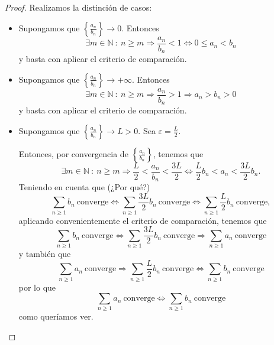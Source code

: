 \begin{proof} Realizamos la distinción de casos:
    \begin{itemize}
        \item Supongamos que $\left\{ \frac{a_n}{b_n} \right\} \longrightarrow 0$. Entonces
        \begin{equation*}
            \exists m \in \mathbb{N} ~:~ n \geq m \Longrightarrow \frac{a_n}{b_n} < 1 \Longleftrightarrow 0 \leq a_n < b_n
        \end{equation*}
        y basta con aplicar el criterio de comparación.

        \item Supongamos que $\left\{ \frac{a_n}{b_n} \right\} \longrightarrow +\infty$. Entonces
        \begin{equation*}
            \exists m \in \mathbb{N} ~:~ n \geq m \Longrightarrow \frac{a_n}{b_n} > 1 \Longrightarrow a_n > b_n > 0
        \end{equation*}
        y basta con aplicar el criterio de comparación.

        \item Supongamos que $\left\{ \frac{a_n}{b_n} \right\} \longrightarrow L > 0$. Sea $\varepsilon = \frac{L}{2}$.
        
        Entonces, por convergencia de $\left\{ \frac{a_n}{b_n} \right\}$, tenemos que
        \begin{equation*}
            \exists m \in \mathbb{N} ~:~ n \geq m \Longrightarrow \frac{L}{2} < \frac{a_n}{b_n} < \frac{3L}{2} \Longleftrightarrow \frac{L}{2} b_n < a_n < \frac{3L}{2} b_n.
        \end{equation*}
        Teniendo en cuenta que (¿Por qué?)
        \begin{equation*}
            \displaystyle\sum_{n \geq 1} b_n ~ \text{converge} \Longleftrightarrow \displaystyle\sum_{n \geq 1} \frac{3L}{2} b_n ~ \text{converge} \Longleftrightarrow \displaystyle\sum_{n \geq 1} \frac{L}{2} b_n ~ \text{converge},
        \end{equation*}
        aplicando convenientemente el criterio de comparación, tenemos que
        \begin{equation*}
            \displaystyle\sum_{n \geq 1} b_n ~ \text{converge} \Longleftrightarrow \displaystyle\sum_{n \geq 1} \frac{3L}{2} b_n ~ \text{converge} \Longrightarrow \displaystyle\sum_{n \geq 1} a_n ~ \text{converge}
        \end{equation*}
        y también que
        \begin{equation*}
            \displaystyle\sum_{n \geq 1} a_n ~ \text{converge} \Longrightarrow \displaystyle\sum_{n \geq 1} \frac{L}{2} b_n ~ \text{converge} \Longleftrightarrow \displaystyle\sum_{n \geq 1} b_n ~ \text{converge}
        \end{equation*}
        por lo que
        \begin{equation*}
            \displaystyle\sum_{n \geq 1} a_n ~ \text{converge} \Longleftrightarrow  \displaystyle\sum_{n \geq 1} b_n ~ \text{converge}
        \end{equation*}
        como queríamos ver.
    \end{itemize}
\end{proof}

